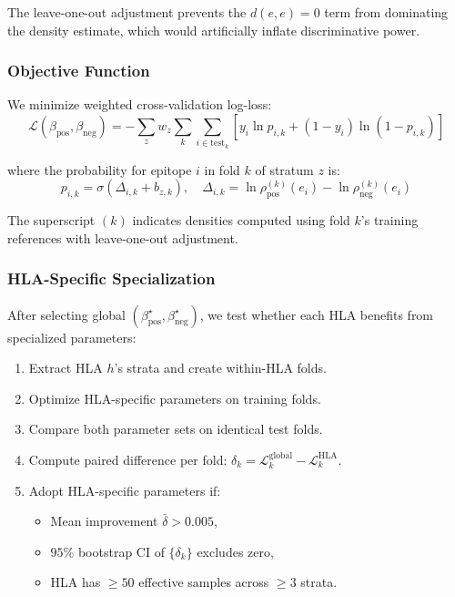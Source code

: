 \documentclass[11pt]{article}
\begin{document}
The leave-one-out adjustment prevents the $d(e,e) = 0$ term from dominating the density estimate, which would artificially inflate discriminative power.

\subsubsection{Objective Function}

We minimize weighted cross-validation log-loss:
\[
\mathcal{L}(\beta_{\mathrm{pos}}, \beta_{\mathrm{neg}}) = -\sum_{z} w_z \sum_{k} \sum_{i \in \text{test}_k} \left[ y_i \ln p_{i,k} + (1-y_i) \ln(1-p_{i,k}) \right]
\]

where the probability for epitope $i$ in fold $k$ of stratum $z$ is:
\[
 p_{i,k} = \sigma(\Delta_{i,k} + b_{z,k}), \quad \Delta_{i,k} = \ln \rho_{\mathrm{pos}}^{(k)}(e_i) - \ln \rho_{\mathrm{neg}}^{(k)}(e_i)
\]

The superscript $(k)$ indicates densities computed using fold $k$'s training references with leave-one-out adjustment.

\subsubsection{HLA-Specific Specialization}

After selecting global $(\beta_{\mathrm{pos}}^{\star}, \beta_{\mathrm{neg}}^{\star})$, we test whether each HLA benefits from specialized parameters:
\begin{enumerate}
  \item Extract HLA $h$'s strata and create within-HLA folds.
  \item Optimize HLA-specific parameters on training folds.
  \item Compare both parameter sets on identical test folds.
  \item Compute paired difference per fold: $\delta_k = \mathcal{L}_k^{\text{global}} - \mathcal{L}_k^{\text{HLA}}$.
  \item Adopt HLA-specific parameters if:
    \begin{itemize}
      \item Mean improvement $\bar{\delta} > 0.005$,
      \item $95\%$ bootstrap CI of $\{\delta_k\}$ excludes zero,
      \item HLA has $\geq 50$ effective samples across $\geq 3$ strata.
    \end{itemize}
\end{enumerate}
\end{document}
